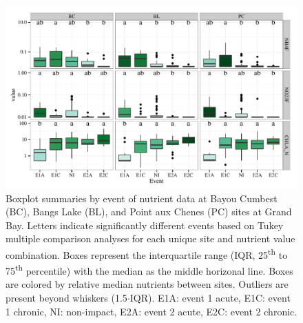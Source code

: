 \documentclass[letterpaper,12pt]{article}\usepackage[]{graphicx}\usepackage[]{color}
\makeatletter
\def\maxwidth{ %
  \ifdim\Gin@nat@width>\linewidth
    \linewidth
  \else
    \Gin@nat@width
  \fi
}
\makeatother
\begin{document}
\begin{figure}[!ht]

{\centering \includegraphics[width=\maxwidth]{figs/boxplt_all-1} 

}

\caption[Boxplot summaries by event of nutrient data at Bayou Cumbest (BC), Bangs Lake (BL), and Point aux Chenes (PC) sites at Grand Bay]{Boxplot summaries by event of nutrient data at Bayou Cumbest (BC), Bangs Lake (BL), and Point aux Chenes (PC) sites at Grand Bay.  Letters indicate significantly different events based on Tukey multiple comparison analyses for each unique site and nutrient value combination.  Boxes represent the interquartile range (IQR, 25\textsuperscript{th} to 75\textsuperscript{th} percentile) with the median as the middle horizonal line.  Boxes are colored by relative median nutrients between sites.  Outliers are present beyond whiskers (1.5$\cdot$IQR). E1A: event 1 acute, E1C: event 1 chronic, NI: non-impact, E2A: event 2 acute, E2C: event 2 chronic.}\label{fig:boxplt_all}
\end{figure}
\end{document}
